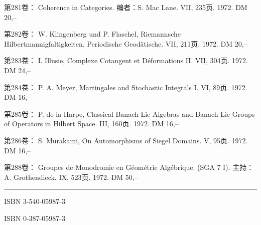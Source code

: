 第281卷： Coherence in Categories. 编者：S. Mac Lane. VII, 235页. 1972. DM 20,--

第282卷： W. Klingenberg und P. Flaschel, Riemannsche Hilbertmannigfaltigkeiten. Periodische Geodätische. VII, 211页. 1972. DM 20,--

第283卷： L Illusie, Complexe Cotangent et Déformations II. VII, 304页. 1972. DM 24,--

第284卷： P. A. Meyer, Martingales and Stochastic Integrals I. VI, 89页. 1972. DM 16,--

第285卷： P. de la Harpe, Classical Banach-Lie Algebras and Banach-Lie Groups of Operators in Hilbert Space. III, 160页. 1972. DM 16,--

第286卷： S. Murakami, On Automorphisms of Siegel Domains. V, 95页. 1972. DM 16,--

第288卷： Groupes de Monodromie en Géométrie Algébrique. (SGA 7 I). 主持：A. Grothendieck. IX, 523页. 1972. DM 50,--

\noindent\rule{\linewidth}{0.4pt}



ISBN 3-540-05987-3

ISBN 0-387-05987-3
\endgroup



